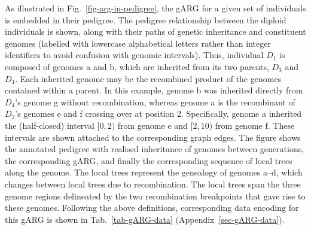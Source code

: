\documentclass{article}
\newcommand{\noderef}[1]{\textsf{#1}}
\begin{document}
As illustrated in Fig.~\ref{fig-arg-in-pedigree},
the gARG for a given set of individuals is embedded in their pedigree.
The pedigree relationship between the diploid individuals is
shown, along with their paths
of genetic inheritance and constituent genomes (labelled
with lowercase alphabetical letters
rather than integer identifiers to avoid confusion with genomic
intervals).
Thus, individual $D_1$ is composed
of genomes \noderef{a} and \noderef{b}, which are inherited from its
two parents, $D_3$ and $D_4$. Each inherited genome may be the recombined product
of the genomes contained within a parent. In this example,
genome \noderef{b} was inherited directly from $D_4$'s genome \noderef{g} without
recombination, whereas
genome \noderef{a} is the recombinant of
$D_2$'s genomes \noderef{e} and \noderef{f} crossing over at position 2.
Specifically, genome \noderef{a} inherited the (half-closed)
interval $[0, 2)$ from genome \noderef{e} and $[2, 10)$ from genome \noderef{f}.
These intervals are shown attached to the corresponding graph edges.
The figure shows the annotated pedigree with realised inheritance of genomes
between generations, the corresponding gARG, and finally the corresponding
sequence of local trees along the genome.
The local trees represent the genealogy of genomes \noderef{a}--\noderef{d},
which changes between local trees due to recombination.
The local trees span the three genome regions delineated
by the two recombination breakpoints that gave rise to these genomes.
Following the above definitions, corresponding data encoding for
this gARG is shown in Tab.~\ref{tab-gARG-data} (Appendix~\ref{sec-gARG-data}).
\end{document}

